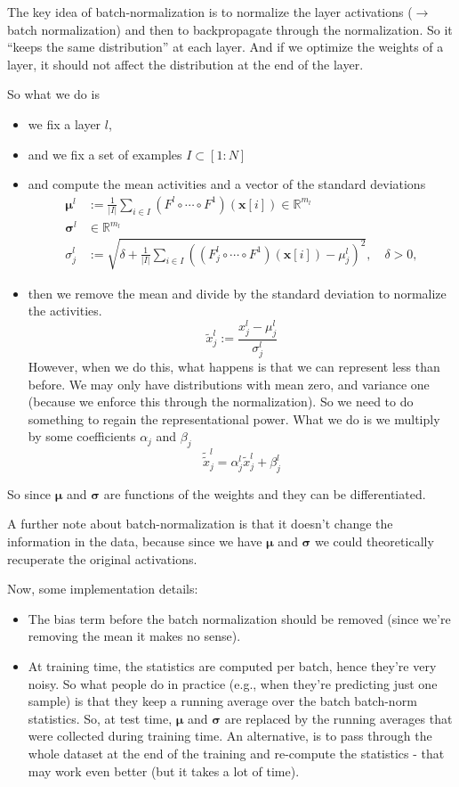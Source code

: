 \documentclass[a2paper,4pt]{extarticle}
\newcommand{\R}{\mathbb{R}}
\newcommand{\card}[1]{\left\lvert #1 \right\rvert}
\renewcommand{\vec}[1]{\mathbf{#1}}
\newcommand{\vx}{\vec{x}}
\newcommand{\vmu}{\boldsymbol{\mu}}
\newcommand{\vsigma}{\boldsymbol{\sigma}}
\newcommand{\ssep}{\hdashrule[1.1ex]{\linewidth}{0.1pt}{0.3mm}\vspace{-6pt}}
\newcommand{\ssep}{\hdashrule[1.1ex]{\linewidth}{0.1pt}{0.3mm}\vspace{-3pt}}
\begin{document}
\begin{landscape}
\begin{multicols*}{7}
\ssep

The key idea of batch-normalization is to normalize the layer activations
($\to$ batch normalization) and then to backpropagate through the normalization.
So it ``keeps the same distribution'' at each layer. And if we optimize the
weights of a layer, it should not affect the distribution at the end of the
layer.

So what we do is
\begin{itemize}
  \item we fix a layer $l$,
  \item and we fix a set of examples $I\subset[1:N]$
  \item and compute the mean activities and a vector of the standard deviations
\begin{align*}
\vmu^{l}
&:=
\frac{1}{\card{I}}
\sum_{i\in I}
(F^l\circ\cdots\circ F^1)(\vx[i])\in\R^{m_l}
\\
\vsigma^l&\in\R^{m_l}
\\
\sigma_j^l
&:=
\sqrt{
\delta
+
\frac{1}{\card{I}}
\sum_{i\in I}
\left(
(F^l_j\circ\cdots\circ F^1)(\vx[i])
-\mu_j^l
\right)^2
},
\quad
\delta > 0,
\end{align*}
  \item then we remove the mean and divide by the standard deviation to
  normalize the activities.
  \[
  \tilde{x}_j^l
  :=\frac{x_j^l-\mu_j^l}{\sigma_j^l}
  \]
  However, when we do this, what happens is that we can represent less than
  before. We may only have distributions with mean zero, and variance one
  (because we enforce this through the normalization). So we need to do
  something to regain the representational power. What we do is we multiply by
  some coefficients $\alpha_j$ and $\beta_j$
  \[
  \tilde{\tilde{x}}_j^l=\alpha_j^l\tilde{x}_j^l+\beta_j^l
  \]
\end{itemize}
So since $\vmu$ and $\vsigma$ are functions of the weights and they can be
differentiated. 

A further note about batch-normalization is that it doesn't change the
information in the data, because since we have $\vmu$ and $\vsigma$ we could
theoretically recuperate the original activations.

Now, some implementation details:
\begin{itemize}
  \item The bias term before the batch normalization should be removed (since
  we're removing the mean it makes no sense).
  \item At training time, the statistics are computed per batch, hence they're
  very noisy. So what people do in practice (e.g., when they're predicting just
  one sample) is that they keep a running average over the batch batch-norm
  statistics. So, at test time, $\vmu$ and $\vsigma$ are replaced by the running
  averages that were collected during training time. An alternative, is to pass
  through the whole dataset at the end of the training and re-compute the
  statistics - that may work even better (but it takes a lot of time).
\end{itemize}


\end{multicols*}
\end{landscape}
\end{document}
